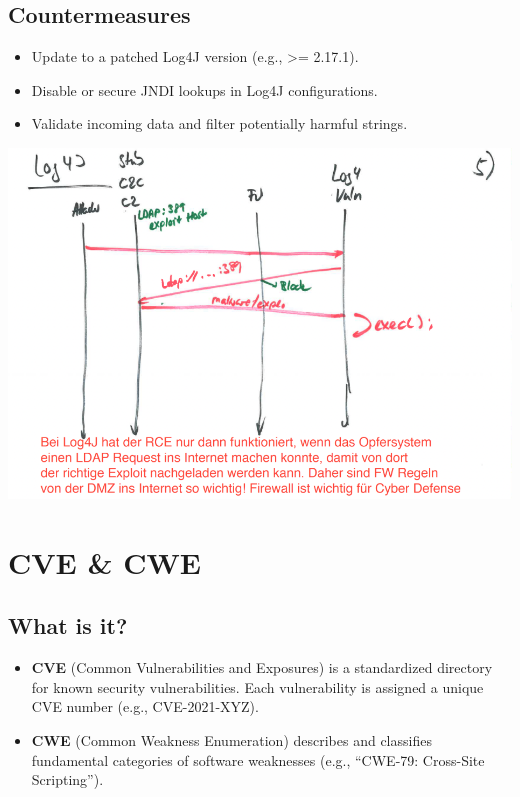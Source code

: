 \subsection*{Countermeasures}
\begin{itemize}
    \item Update to a patched Log4J version (e.g., >= 2.17.1).
    \item Disable or secure JNDI lookups in Log4J configurations.
    \item Validate incoming data and filter potentially harmful strings.
\end{itemize}

\begin{center}
    \includegraphics[scale=1]{resources/01_log4j_sequence.png}
\end{center}

\section*{CVE \& CWE}
\subsection*{What is it?}
\begin{itemize}
    \item \textbf{CVE} (Common Vulnerabilities and Exposures) is a standardized directory for known security vulnerabilities. Each vulnerability is assigned a unique CVE number (e.g., CVE-2021-XYZ).
    \item \textbf{CWE} (Common Weakness Enumeration) describes and classifies fundamental categories of software weaknesses (e.g., “CWE-79: Cross-Site Scripting”).
\end{itemize}

